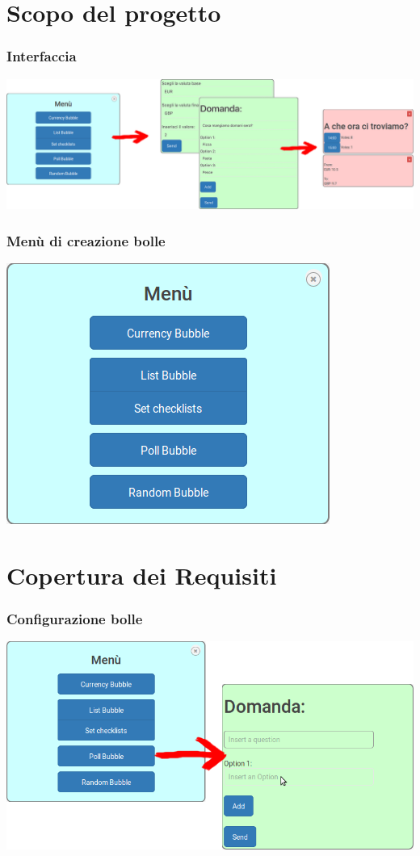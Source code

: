 \section{Scopo del progetto}
\begin{frame}
	\frametitle{Interfaccia}
	\includegraphics[scale=0.50]{img/interf.png}
	
\end{frame}
\begin{frame}
	\frametitle{Menù di creazione bolle}
	\includegraphics[scale=0.50]{img/menu.png}
	
\end{frame}

\section{Copertura dei Requisiti}
\begin{frame}
	\frametitle{Configurazione bolle}
	\includegraphics[scale=0.35]{img/config.png}
\end{frame}

